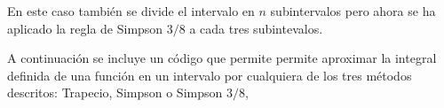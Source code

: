 En este caso también se divide el intervalo en $n$ subintervalos pero ahora se ha aplicado la regla de Simpson $3/8$ a cada tres subintevalos.

A continuación se incluye un código que permite permite aproximar la integral definida de una función en un intervalo por cualquiera de los tres métodos descritos: Trapecio, Simpson o Simpson $3/8$,

%
%

